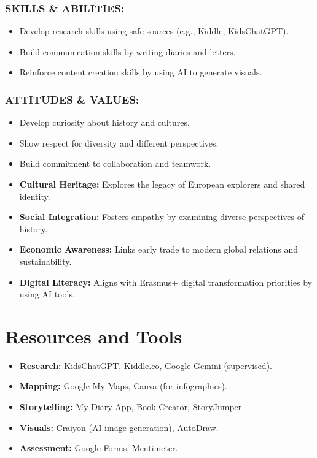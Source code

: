 \documentclass[11pt, a4paper]{article}
\begin{document}
\subsubsection*{SKILLS \& ABILITIES:}
\begin{itemize}
    \item Develop research skills using safe sources (e.g., Kiddle, KidsChatGPT).
    \item Build communication skills by writing diaries and letters.
    \item Reinforce content creation skills by using AI to generate visuals.
\end{itemize}

\subsubsection*{ATTITUDES \& VALUES:}
\begin{itemize}
    \item Develop curiosity about history and cultures.
    \item Show respect for diversity and different perspectives.
    \item Build commitment to collaboration and teamwork.
\end{itemize}

\begin{eurobox}
\begin{itemize}
    \item \textbf{Cultural Heritage:} Explores the legacy of European explorers and shared identity.
    \item \textbf{Social Integration:} Fosters empathy by examining diverse perspectives of history.
    \item \textbf{Economic Awareness:} Links early trade to modern global relations and sustainability.
    \item \textbf{Digital Literacy:} Aligns with Erasmus+ digital transformation priorities by using AI tools.
\end{itemize}
\end{eurobox}

\newpage
\section{Resources and Tools}
\begin{itemize}
    \item \textbf{Research:} KidsChatGPT, Kiddle.co, Google Gemini (supervised).
    \item \textbf{Mapping:} Google My Maps, Canva (for infographics).
    \item \textbf{Storytelling:} My Diary App, Book Creator, StoryJumper.
    \item \textbf{Visuals:} Craiyon (AI image generation), AutoDraw.
    \item \textbf{Assessment:} Google Forms, Mentimeter.
\end{itemize}
\end{document}
